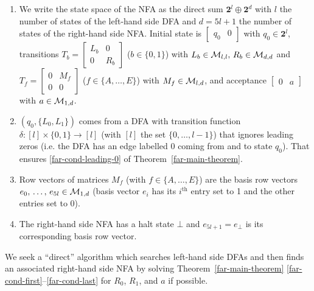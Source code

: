 {  \begin{enumerate}
    \item We write the state space of the NFA as the direct sum $\mathbf{2}^l \oplus \mathbf{2}^d$ with $l$ the number of states of the left-hand side DFA and $d=5l+1$ the number of states of the right-hand side NFA. Initial state is $\begin{bmatrix}q_0&0\end{bmatrix}$ with $q_0 \in \mathbf{2}^l$,
          transitions
          $T_b=\begin{bmatrix}L_b&0\\0&R_b\end{bmatrix}$ ($b\in\{0,1\}$) with $L_b \in \mathcal{M}_{l,l},\, R_b \in \mathcal{M}_{d,d}$ and
          $T_f=\begin{bmatrix}0&M_f\\0&0\end{bmatrix}$ ($f\in\{A,\ldots,E\}$) with $M_f \in \mathcal{M}_{l,d}$,
          and acceptance $\begin{bmatrix}0&a\end{bmatrix}$ with $a \in \mathcal{M}_{1,d}$.
    \item $(q_0,\{L_0, L_1\})$ comes from a DFA with transition function $\delta: [l] \times \{0,1\} \to [l]$ (with $[l]$ the set $\{0,\dots,l-1\}$) that ignores leading zeros (i.e. the DFA has an edge labelled 0 coming from and to state $q_0$). That ensures \eqref{far-cond-leading-0} of Theorem~\ref{far-main-theorem}.
    \item Row vectors of matrices $M_f$ (with $f\in\{A,\ldots,E\}$) are the basis row vectors $e_0,\, \dots,\, e_{5l} \in \mathcal{M}_{1,d}$ (basis vector $e_i$ has its $i^\text{th}$ entry set to 1 and the other entries set to 0).\label{pt:basis}
    \item The right-hand side NFA has a halt state $\bot$ and $e_{5l+1} = e_\bot$ is its corresponding basis row vector.

  \end{enumerate}

  We seek a ``direct'' algorithm which searches left-hand side DFAs and then finds an associated right-hand side NFA by solving Theorem~\ref{far-main-theorem} \eqref{far-cond-first}--\eqref{far-cond-last} for $R_0$, $R_1$, and $a$ if possible.

}
